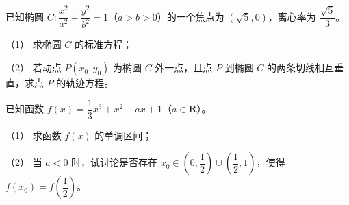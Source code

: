 \begin{question}
已知椭圆 $C:\dfrac{x^2}{a^2}+\dfrac{y^2}{b^2}=1$（$a>b>0$）的一个焦点为 $(\sqrt5,0)$，离心率为 $\dfrac{\sqrt5}{3}$。

（1） 求椭圆 $C$ 的标准方程；

（2） 若动点 $P(x_0,y_0)$ 为椭圆 $C$ 外一点，且点 $P$ 到椭圆 $C$ 的两条切线相互垂直，求点 $P$ 的轨迹方程。

\end{question}
\begin{question}
已知函数 $f(x)=\dfrac13x^3+x^2+ax+1$（$a\in\mathbf R$）。

（1） 求函数 $f(x)$ 的单调区间；

（2） 当 $a<0$ 时，试讨论是否存在 $x_0\in\left(0,\dfrac12\right)\cup\left(\dfrac12,1\right)$，使得 $f(x_0)=f\left(\dfrac12\right)$。

\end{question}